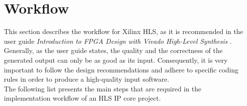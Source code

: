 \section{Workflow}
\label{sec:hls:workflow}

This section describes the workflow for Xilinx HLS, as it is recommended in the user guide \textit{Introduction to FPGA Design with Vivado High-Level Synthesis} \cite{VivadoUgHLSIntro}.\\

Generally, as the user guide states, the quality and the correctness of the generated output can only be as good as its input.
Consequently, it is very important to follow the design recommendations and adhere to specific coding rules in order to produce a high-quality input software.\\

The following list presents the main steps that are required in the implementation workflow of an HLS IP core project.\\

